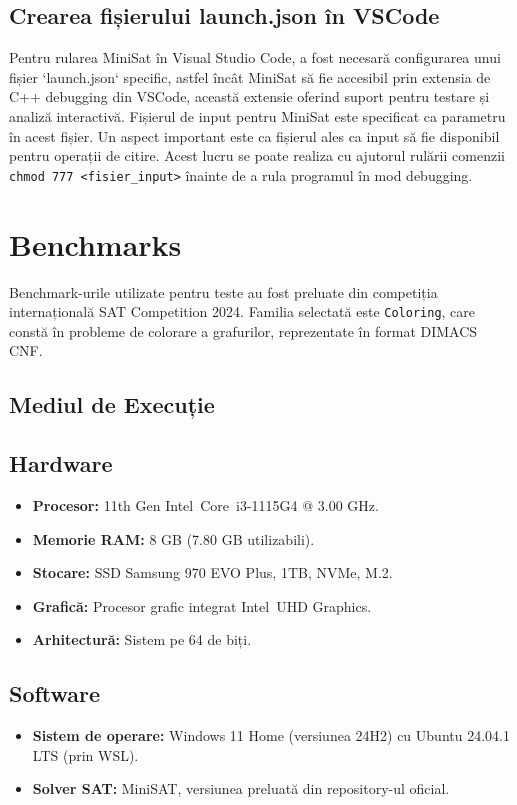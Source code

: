 \documentclass{llncs}
\begin{document}
\subsection{Crearea fișierului launch.json în VSCode}

Pentru rularea MiniSat în Visual Studio Code, a fost necesară configurarea unui fișier `launch.json` specific, astfel încât MiniSat să fie accesibil prin extensia de C++ debugging din VSCode, această extensie oferind suport pentru testare și analiză interactivă. Fișierul de input pentru MiniSat este specificat ca parametru în acest fișier. Un aspect important este ca fișierul ales ca input să fie disponibil pentru operații de citire. Acest lucru se poate realiza cu ajutorul rulării comenzii \texttt{chmod 777 <fisier\_input>} înainte de a rula programul în mod debugging.

\section{Benchmarks}

Benchmark-urile utilizate pentru teste au fost preluate din competiția internațională SAT Competition 2024\cite{ref_SAT_Competition_home_page}.
Familia selectată este \texttt{Coloring}, care constă în probleme de colorare a grafurilor, reprezentate în format DIMACS CNF.
\subsection{Mediul de Execuție}
\subsection*{Hardware}
\begin{itemize}
    \item \textbf{Procesor:} 11th Gen Intel\textregistered\ Core\texttrademark\ i3-1115G4 @ 3.00 GHz.
    \item \textbf{Memorie RAM:} 8 GB (7.80 GB utilizabili).
    \item \textbf{Stocare:} SSD Samsung 970 EVO Plus, 1TB, NVMe, M.2.
    \item \textbf{Grafică:} Procesor grafic integrat Intel\textregistered\ UHD Graphics.
    \item \textbf{Arhitectură:} Sistem pe 64 de biți.
\end{itemize}

\subsection*{Software}
\begin{itemize}
    \item \textbf{Sistem de operare:} Windows 11 Home (versiunea 24H2) cu Ubuntu 24.04.1 LTS (prin WSL).
    \item \textbf{Solver SAT:} MiniSAT, versiunea preluată din repository-ul oficial.
\end{itemize}
\end{document}
